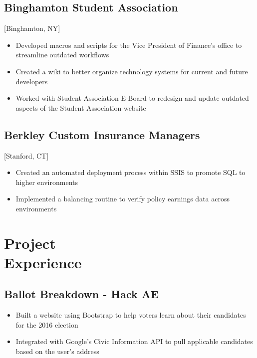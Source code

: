 \documentclass{mycv}
\begin{document}
\subsection{Binghamton Student Association}[Binghamton, NY]
\begin{positions}
\end{positions}

\begin{itemize}
  \item Developed macros and scripts for the Vice President of Finance's office to streamline outdated workflows
  \item Created a wiki to better organize technology systems for current and future developers
  \item Worked with Student Association E-Board to redesign and update outdated aspects of the Student Association website
\end{itemize}

\subsection{Berkley Custom Insurance Managers}[Stanford, CT]
\begin{positions}
\end{positions}

\begin{itemize}
  \item Created an automated deployment process within SSIS to promote SQL to higher environments
  \item Implemented a balancing routine to verify policy earnings data across environments
\end{itemize}

\section{Project  \\ Experience}
\subsection{Ballot Breakdown - Hack AE}
\begin{itemize}
  \item Built a website using Bootstrap to help voters learn about their candidates for the 2016 election
  \item Integrated with Google's Civic Information API to pull applicable candidates based on the user's address
\end{itemize}
\end{document}
